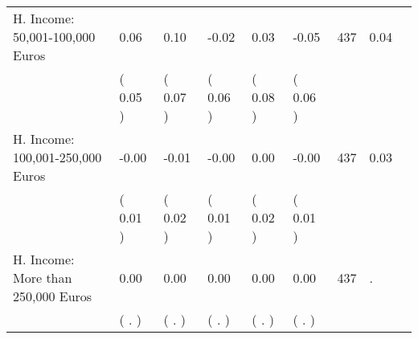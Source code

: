 \begin{tabular}{L{6.2cm} C{1.8cm} C{1.8cm} C{1.8cm} C{1.8cm} C{1.8cm} C{1.8cm} C{0.3cm} C{0.3cm}}
H. Income: 50,001-100,000 Euros &      0.06 &      0.10 &     -0.02 &      0.03 &     -0.05  & 437 &       0.04 \\ 
 & (     0.05 ) & (     0.07 ) & (     0.06 ) & (     0.08 ) & (     0.06 )  & \\
H. Income: 100,001-250,000 Euros &     -0.00 &     -0.01 &     -0.00 &      0.00 &     -0.00  & 437 &       0.03 \\ 
 & (     0.01 ) & (     0.02 ) & (     0.01 ) & (     0.02 ) & (     0.01 )  & \\
H. Income: More than 250,000 Euros &      0.00 &      0.00 &      0.00 &      0.00 &      0.00  & 437 &          . \\ 
 & (        . ) & (        . ) & (        . ) & (        . ) & (        . )  & \\
\bottomrule
\end{tabular}
